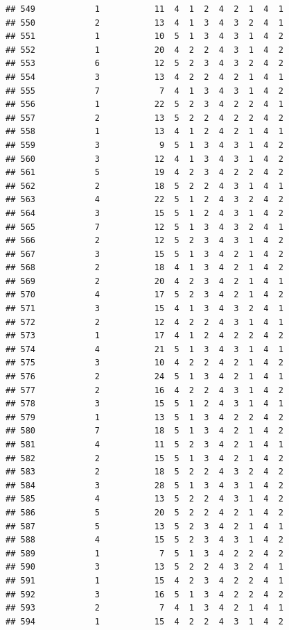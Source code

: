 \documentclass[12pt,]{krantz}
\theoremstyle{definition}
\theoremstyle{definition}
\theoremstyle{remark}
\begin{document}
\begin{verbatim}
## 549            1           11  4  1  2  4  2  1  4  1
## 550            2           13  4  1  3  4  3  2  4  1
## 551            1           10  5  1  3  4  3  1  4  2
## 552            1           20  4  2  2  4  3  1  4  2
## 553            6           12  5  2  3  4  3  2  4  2
## 554            3           13  4  2  2  4  2  1  4  1
## 555            7            7  4  1  3  4  3  1  4  2
## 556            1           22  5  2  3  4  2  2  4  1
## 557            2           13  5  2  2  4  2  2  4  2
## 558            1           13  4  1  2  4  2  1  4  1
## 559            3            9  5  1  3  4  3  1  4  2
## 560            3           12  4  1  3  4  3  1  4  2
## 561            5           19  4  2  3  4  2  2  4  2
## 562            2           18  5  2  2  4  3  1  4  1
## 563            4           22  5  1  2  4  3  2  4  2
## 564            3           15  5  1  2  4  3  1  4  2
## 565            7           12  5  1  3  4  3  2  4  1
## 566            2           12  5  2  3  4  3  1  4  2
## 567            3           15  5  1  3  4  2  1  4  2
## 568            2           18  4  1  3  4  2  1  4  2
## 569            2           20  4  2  3  4  2  1  4  1
## 570            4           17  5  2  3  4  2  1  4  2
## 571            3           15  4  1  3  4  3  2  4  1
## 572            2           12  4  2  2  4  3  1  4  1
## 573            1           17  4  1  2  4  2  2  4  2
## 574            4           21  5  1  3  4  3  1  4  1
## 575            3           10  4  2  2  4  2  1  4  2
## 576            2           24  5  1  3  4  2  1  4  1
## 577            2           16  4  2  2  4  3  1  4  2
## 578            3           15  5  1  2  4  3  1  4  1
## 579            1           13  5  1  3  4  2  2  4  2
## 580            7           18  5  1  3  4  2  1  4  2
## 581            4           11  5  2  3  4  2  1  4  1
## 582            2           15  5  1  3  4  2  1  4  2
## 583            2           18  5  2  2  4  3  2  4  2
## 584            3           28  5  1  3  4  3  1  4  2
## 585            4           13  5  2  2  4  3  1  4  2
## 586            5           20  5  2  2  4  2  1  4  2
## 587            5           13  5  2  3  4  2  1  4  1
## 588            4           15  5  2  3  4  3  1  4  2
## 589            1            7  5  1  3  4  2  2  4  2
## 590            3           13  5  2  2  4  3  2  4  1
## 591            1           15  4  2  3  4  2  2  4  1
## 592            3           16  5  1  3  4  2  2  4  2
## 593            2            7  4  1  3  4  2  1  4  1
## 594            1           15  4  2  2  4  3  1  4  2

\end{verbatim}
\end{document}

